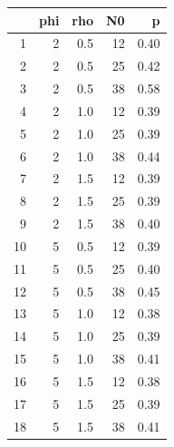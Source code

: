 \begin{table}[ht]
\centering
\begin{tabular}{rrrrr}
  \hline
 & phi & rho & N0 & p \\ 
  \hline
1 & 2 & 0.5 & 12 & 0.40 \\ 
  2 & 2 & 0.5 & 25 & 0.42 \\ 
  3 & 2 & 0.5 & 38 & 0.58 \\ 
  4 & 2 & 1.0 & 12 & 0.39 \\ 
  5 & 2 & 1.0 & 25 & 0.39 \\ 
  6 & 2 & 1.0 & 38 & 0.44 \\ 
  7 & 2 & 1.5 & 12 & 0.39 \\ 
  8 & 2 & 1.5 & 25 & 0.39 \\ 
  9 & 2 & 1.5 & 38 & 0.40 \\ 
  10 & 5 & 0.5 & 12 & 0.39 \\ 
  11 & 5 & 0.5 & 25 & 0.40 \\ 
  12 & 5 & 0.5 & 38 & 0.45 \\ 
  13 & 5 & 1.0 & 12 & 0.38 \\ 
  14 & 5 & 1.0 & 25 & 0.39 \\ 
  15 & 5 & 1.0 & 38 & 0.41 \\ 
  16 & 5 & 1.5 & 12 & 0.38 \\ 
  17 & 5 & 1.5 & 25 & 0.39 \\ 
  18 & 5 & 1.5 & 38 & 0.41 \\ 
   \hline
\end{tabular}
\end{table}
